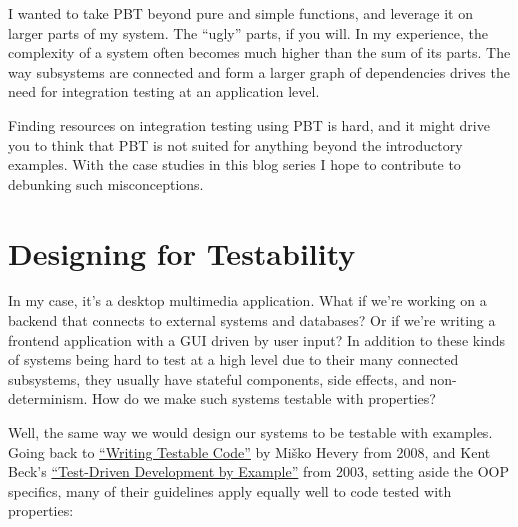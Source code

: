 I wanted to take PBT beyond pure and simple functions, and leverage it on larger parts of my system. The ``ugly'' parts, if you will. In my experience, the complexity of a system often becomes much higher than the sum of its parts. The way subsystems are connected and form a larger graph of dependencies drives the need for integration testing at an application level.

Finding resources on integration testing using PBT is hard, and it might drive you to think that PBT is not suited for anything beyond the introductory examples. With the case studies in this blog series I hope to contribute to debunking such misconceptions.

\section{Designing for Testability}


In my case, it's a desktop multimedia application. What if we're working on a backend that connects to external systems and databases? Or if we're writing a frontend application with a GUI driven by user input? In addition to these kinds of systems being hard to test at a high level due to their many connected subsystems, they usually have stateful components, side effects, and non-determinism. How do we make such systems testable with properties?

Well, the same way we would design our systems to be testable with examples. Going back to \href{https://testing.googleblog.com/2008/08/by-miko-hevery-so-you-decided-to.html}{``Writing Testable Code''} by Mi\v{s}ko Hevery from 2008, and Kent Beck's \href{https://www.amazon.com/Test-Driven-Development-Kent-Beck/dp/0321146530}{``Test-Driven Development by Example''} from 2003, setting aside the OOP specifics, many of their guidelines apply equally well to code tested with properties:

